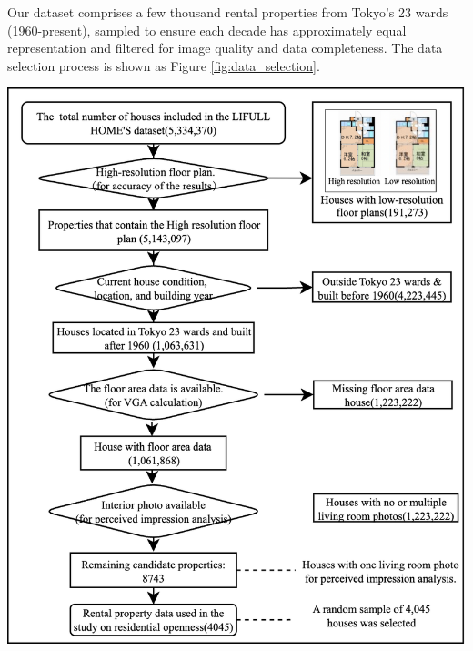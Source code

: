 \documentclass[11pt,a4paper]{article}
\begin{document}
\begin{multicols}{2}
Our dataset comprises a few thousand rental properties from Tokyo's 23 wards (1960-present), 
sampled to ensure each decade has approximately equal representation and filtered for image quality and data completeness. The data selection process is
shown as Figure \ref{fig:data_selection}.
\begin{center}
    \includegraphics[width=0.9\columnwidth]{plots/data_filtering.png}
    \label{fig:data_selection}
\end{center}




\end{multicols}
\end{document}
